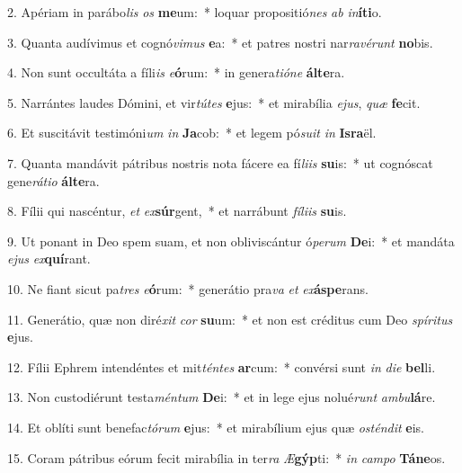 2. Apériam in parábo\textit{lis} \textit{os} \textbf{me}um:~*  loquar propositió\textit{nes} \textit{ab} \textit{in}\textbf{í}\textbf{ti}o.\

3. Quanta audívimus et cognó\textit{vi}\textit{mus} \textbf{e}a:~*  et patres nostri nar\textit{ra}\textit{vé}\textit{runt} \textbf{no}bis.\

4. Non sunt occultáta a fíli\textit{is} \textit{e}\textbf{ó}rum:~*  in genera\textit{ti}\textit{ó}\textit{ne} \textbf{ál}\textbf{te}ra.\

5. Narrántes laudes Dómini, et vir\textit{tú}\textit{tes} \textbf{e}jus:~*  et mirabília \textit{e}\textit{jus}, \textit{quæ} \textbf{fe}cit.\

6. Et suscitávit testimóni\textit{um} \textit{in} \textbf{Ja}cob:~*  et legem pó\textit{su}\textit{it} \textit{in} \textbf{Is}\textbf{ra}ël.\

7. Quanta mandávit pátribus nostris nota fácere ea fí\textit{li}\textit{is} \textbf{su}is:~*  ut cognóscat gene\textit{rá}\textit{ti}\textit{o} \textbf{ál}\textbf{te}ra.\

8. Fílii qui nascéntur, \textit{et} \textit{ex}\textbf{súr}gent,~*  et narrábunt \textit{fí}\textit{li}\textit{is} \textbf{su}is.\

9. Ut ponant in Deo spem suam, et non obliviscántur ó\textit{pe}\textit{rum} \textbf{De}i:~*  et mandáta \textit{e}\textit{jus} \textit{ex}\textbf{quí}rant.\

10. Ne fiant sicut pa\textit{tres} \textit{e}\textbf{ó}rum:~*  generátio pra\textit{va} \textit{et} \textit{ex}\textbf{ás}\textbf{pe}rans.\

11. Generátio, quæ non diré\textit{xit} \textit{cor} \textbf{su}um:~*  et non est créditus cum Deo \textit{spí}\textit{ri}\textit{tus} \textbf{e}jus.\

12. Fílii Ephrem intendéntes et mit\textit{tén}\textit{tes} \textbf{ar}cum:~*  convérsi sunt \textit{in} \textit{di}\textit{e} \textbf{bel}li.\

13. Non custodiérunt testa\textit{mén}\textit{tum} \textbf{De}i:~*  et in lege ejus nolué\textit{runt} \textit{am}\textit{bu}\textbf{lá}re.\

14. Et oblíti sunt benefac\textit{tó}\textit{rum} \textbf{e}jus:~*  et mirabílium ejus quæ \textit{os}\textit{tén}\textit{dit} \textbf{e}is.\

15. Coram pátribus eórum fecit mirabília in ter\textit{ra} \textit{Æ}\textbf{gýp}ti:~*  \textit{in} \textit{cam}\textit{po} \textbf{Tá}\textbf{ne}os.\

